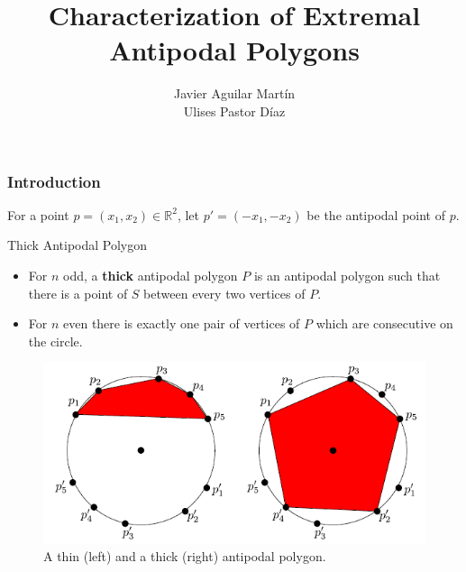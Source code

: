 \documentclass{beamer}
\title{Characterization of Extremal Antipodal Polygons}
\author{Javier Aguilar Martín\\ Ulises Pastor Díaz}
\institute{Universidad de Sevilla}
\newcommand{\R}{\mathbb{R}}
\begin{document}
\frame{\titlepage}

\begin{frame}
\frametitle{Introduction}

For a point $p=(x_1,x_2)\in\R^2$, let $p'=(-x_1,-x_2)$ be the antipodal point of $p$.


\end{frame}

\begin{frame}
\begin{block}{Thick Antipodal Polygon}
\begin{itemize}
\item<1-> For $n$ odd, a \textbf{thick} antipodal polygon $P$ is an antipodal polygon such that there is a point of $S$ between every two vertices of $P$. 
\item<2-> For $n$ even there is exactly one pair of vertices of $P$ which are consecutive on the circle. 
\end{itemize}
\end{block}
\end{frame}

\begin{frame}
\begin{figure}[h!]
\centering
\includegraphics[scale=0.7]{fig1}
\caption{A thin (left) and a thick (right) antipodal polygon.}
\end{figure}
\end{frame}
\end{document}
